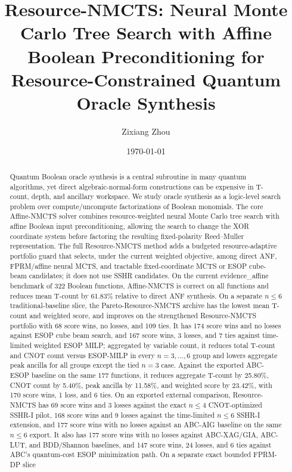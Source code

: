 \documentclass[11pt]{article}
\title{Resource-NMCTS: Neural Monte Carlo Tree Search with Affine Boolean Preconditioning for Resource-Constrained Quantum Oracle Synthesis}
\author{Zixiang Zhou}
\date{\today}
\newcommand{\method}{Resource-NMCTS}
\newcommand{\affinemethod}{Affine-NMCTS}
\newcommand{\paretomethod}{Pareto-Resource-NMCTS}
\newcommand{\dataset}{evidence\_affine}
\begin{document}
\maketitle

\begin{abstract}
Quantum Boolean oracle synthesis is a central subroutine in many quantum
algorithms, yet direct algebraic-normal-form constructions can be expensive in
T-count, depth, and ancillary workspace.  We study oracle synthesis as a
logic-level search problem over compute/uncompute factorizations of Boolean
monomials.  The core \affinemethod{} solver combines resource-weighted neural
Monte Carlo tree search with affine Boolean input preconditioning, allowing the
search to change the XOR coordinate system before factoring the resulting
fixed-polarity Reed--Muller representation.  The full \method{} method adds a
budgeted resource-adaptive portfolio guard that selects, under the current
weighted objective, among direct ANF, FPRM/affine neural MCTS, and tractable
fixed-coordinate MCTS or ESOP cube-beam candidates; it does not use SSHR
candidates.  On the current
\dataset{} benchmark of 322 Boolean functions, \affinemethod{} is correct on
all functions and reduces mean T-count by 61.83\% relative to direct ANF
synthesis.  On a separate $n\leq 6$ traditional-baseline slice, the
\paretomethod{} archive has the lowest mean T-count and weighted score, and
improves on the strengthened \method{} portfolio with 68 score wins, no losses, and 109 ties.  It has
174 score wins and no losses against ESOP cube beam search, and 167 score
wins, 3 losses, and 7 ties against time-limited weighted ESOP MILP; aggregated
by variable count, it reduces total T-count and CNOT count versus ESOP-MILP in
every $n=3,\ldots,6$ group and lowers aggregate peak ancilla for all groups
except the tied $n=3$ case.  Against the exported ABC-ESOP baseline on the
same 177 functions, it reduces aggregate T-count by 25.80\%, CNOT count by
5.40\%, peak ancilla by 11.58\%, and weighted score by 23.42\%, with 170 score
wins, 1 loss, and 6 ties.  On an
exported external comparison, \method{} has 69 score wins and 3 losses against
the exact $n\leq 4$ CNOT-optimized SSHR-I pilot, 168 score wins and 9
losses against the time-limited $n\leq 6$ SSHR-I extension, and 177 score wins
with no losses against an ABC-AIG baseline on the same $n\leq 6$ export.  It
also has 177 score wins with no losses against ABC-XAG/GIA, ABC-LUT, and
BDD/Shannon baselines, and 147 score wins, 24 losses, and 6 ties against ABC's
quantum-cost ESOP minimization path.  On a separate exact bounded FPRM-DP slice

\end{abstract}
\end{document}
